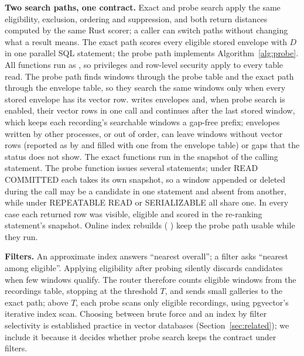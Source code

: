 \documentclass[sigconf]{acmart}
\begin{document}
\textbf{Two search paths, one contract.} Exact and probe search apply the same eligibility, exclusion, ordering and suppression, and both return distances computed by the same Rust scorer; a caller can switch paths without changing what a result means. The exact path scores every eligible stored envelope with $D$ in one parallel SQL statement; the probe path implements Algorithm~\ref{alg:probe}. All functions run as  , so privileges and row-level security apply to every table read. The probe path finds windows through the probe table and the exact path through the envelope table, so they search the same windows only when every stored envelope has its vector row.  writes envelopes and, when probe search is enabled, their vector rows in one call and continues after the last stored window, which keeps each recording's searchable windows a gap-free prefix; envelopes written by other processes, or out of order, can leave windows without vector rows (reported as  by  and filled with one  from the envelope table) or gaps that the status does not show. The exact functions run in the snapshot of the calling statement. The probe function issues several statements; under READ COMMITTED each takes its own snapshot, so a window appended or deleted during the call may be a candidate in one statement and absent from another, while under REPEATABLE READ or SERIALIZABLE all share one. In every case each returned row was visible, eligible and scored in the re-ranking statement's snapshot. Online index rebuilds ( ) keep the probe path usable while they run.

\textbf{Filters.} An approximate index answers ``nearest overall''; a filter asks ``nearest among eligible''. Applying eligibility after probing silently discards candidates when few windows qualify. The router therefore counts eligible windows from the recordings table, stopping at the threshold $T$, and sends small galleries to the exact path; above $T$, each probe scans only eligible recordings, using pgvector's iterative index scan. Choosing between brute force and an index by filter selectivity is established practice in vector databases (Section~\ref{sec:related}); we include it because it decides whether probe search keeps the contract under filters.
\end{document}
